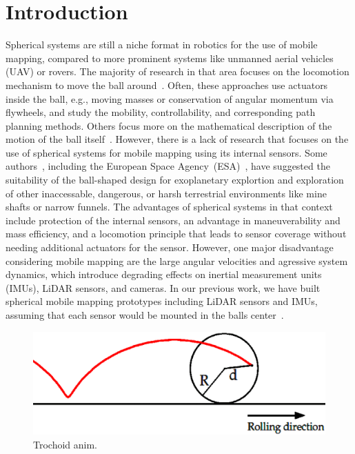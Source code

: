 \section{Introduction}

Spherical systems are still a niche format in robotics for the use of mobile mapping, compared to more prominent systems like unmanned aerial vehicles (UAV) or rovers.
The majority of research in that area focuses on the locomotion mechanism to move the ball around~\cite{Chen2013, Ylikorpi2007, Chase2012, Joshi2010, Anwar2014}.
Often, these approaches use actuators inside the ball, e.g., moving masses or conservation of angular momentum via flywheels, and study the mobility, controllability, and corresponding path planning methods.
Others focus more on the mathematical description of the motion of the ball itself~\cite{Hogan2015Modeling, Mamaev2020Dynamics, Burkhardt2016Reduced, omark2020, fiori2024lie}. 
However, there is a lack of research that focuses on the use of spherical systems for mobile mapping using its internal sensors.
Some authors~\cite{s22041413, Li2023Special, Bruhn2008A}, including the European Space Agency~(ESA)~\cite{ESA}, have suggested the suitability of the ball-shaped design for exoplanetary explortion and exploration of other inaccessable, dangerous, or harsh terrestrial environments like mine shafts or narrow funnels.
The advantages of spherical systems in that context include protection of the internal sensors, an advantage in maneuverability and mass efficiency, and a locomotion principle that leads to sensor coverage without needing additional actuators for the sensor.
However, one major disadvantage considering mobile mapping are the large angular velocities and agressive system dynamics, which introduce degrading effects on inertial measurement units (IMUs), LiDAR sensors, and cameras.
In our previous work, we have built spherical mobile mapping prototypes including LiDAR sensors and IMUs, assuming that each sensor would be mounted in the balls center~\cite{9591183, ARZBERGER2021100004, 10256359}.
\begin{figure}
  \centering
  \includegraphics[width=\linewidth]{img/trochoidanim}
  \caption{Trochoid anim.}
  \label{fig:trochoidanim}
\end{figure}
